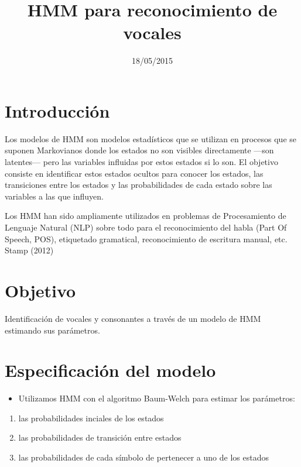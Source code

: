 \documentclass[]{article}
\title{HMM para reconocimiento de vocales}
\author{}
\date{18/05/2015}
\begin{document}
\maketitle


{
\hypersetup{linkcolor=black}
\setcounter{tocdepth}{2}
\tableofcontents
}
\pagebreak

\section{Introducción}\label{introduccion}

Los modelos de HMM son modelos estadísticos que se utilizan en procesos
que se suponen Markovianos donde los estados no son visibles
directamente ---son latentes--- pero las variables influidas por estos
estados si lo son. El objetivo consiste en identificar estos estados
ocultos para conocer los estados, las transiciones entre los estados y
las probabilidades de cada estado sobre las variables a las que
influyen.

Los HMM han sido ampliamente utilizados en problemas de Procesamiento de
Lenguaje Natural (NLP) sobre todo para el reconocimiento del habla (Part
Of Speech, POS), etiquetado gramatical, reconocimiento de escritura
manual, etc. Stamp (2012)

\section{Objetivo}\label{objetivo}

Identificación de vocales y consonantes a través de un modelo de HMM
estimando sus parámetros.

\section{Especificación del modelo}\label{especificacion-del-modelo}

\begin{itemize}
\itemsep1pt\parskip0pt
\item
  Utilizamos HMM con el algoritmo Baum-Welch para estimar los
  parámetros:
\end{itemize}

\begin{enumerate}
\def\labelenumi{\arabic{enumi}.}
\itemsep1pt\parskip0pt
\item
  las probabilidades inciales de los estados
\item
  las probabilidades de transición entre estados
\item
  las probabilidades de cada símbolo de pertenecer a uno de los estados
\end{enumerate}
\end{document}
